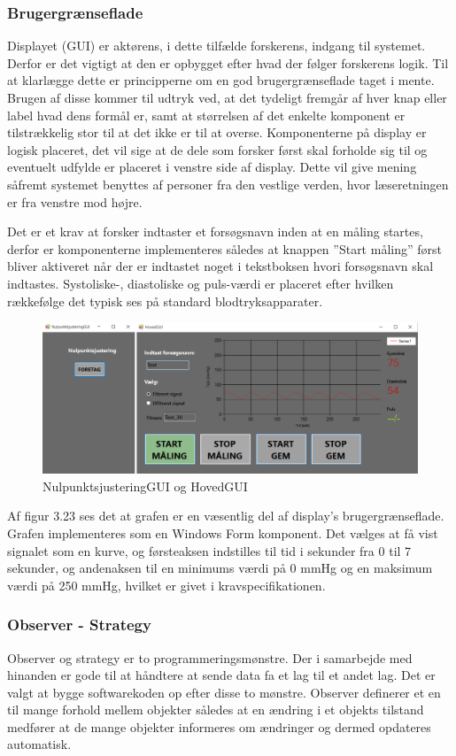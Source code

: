 \subsubsection{Brugergrænseflade}
Displayet (GUI) er aktørens, i dette tilfælde forskerens, indgang til systemet. Derfor er det vigtigt at den er opbygget efter hvad der følger forskerens logik. Til at klarlægge dette er principperne om en god brugergrænseflade taget i mente. Brugen af disse kommer til udtryk ved, at det tydeligt fremgår af hver knap eller label hvad dens formål er, samt at størrelsen af det enkelte komponent er tilstrækkelig stor til at det ikke er til at overse. Komponenterne på display er logisk placeret, det vil sige at de dele som forsker først skal forholde sig til og eventuelt udfylde er placeret i venstre side af display. Dette vil give mening såfremt systemet benyttes af personer fra den vestlige verden, hvor læseretningen er fra venstre mod højre. 

Det er et krav at forsker indtaster et forsøgsnavn inden at en måling startes, derfor er komponenterne implementeres således at knappen ”Start måling” først bliver aktiveret når der er indtastet noget i tekstboksen hvori forsøgsnavn skal indtastes. Systoliske-, diastoliske og puls-værdi er placeret efter hvilken rækkefølge det typisk ses på standard blodtryksapparater. 
\begin{figure}[H]
	\centering
	\includegraphics[width=1.0\textwidth]{Figurer/NulHovedGUI}
	\caption{NulpunktsjusteringGUI og HovedGUI}
\end{figure}
Af figur 3.23 ses det at grafen er en væsentlig del af display’s brugergrænseflade. Grafen implementeres som en Windows Form komponent. Det vælges at få vist signalet som en kurve, og førsteaksen indstilles til tid i sekunder fra 0 til 7 sekunder, og andenaksen til en minimums værdi på 0 mmHg og en maksimum værdi på 250 mmHg, hvilket er givet i kravspecifikationen. 

\subsubsection{Observer - Strategy}
Observer og strategy er to programmeringsmønstre. Der i samarbejde med hinanden er gode til at håndtere at sende data fa et lag til et andet lag. Det er valgt at bygge softwarekoden op efter disse to mønstre. Observer definerer et en til mange forhold mellem objekter således at en ændring i et objekts tilstand medfører at de mange objekter informeres om ændringer og dermed opdateres automatisk.


